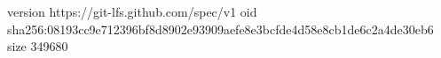 version https://git-lfs.github.com/spec/v1
oid sha256:08193cc9e712396bf8d8902e93909aefe8e3bcfde4d58e8cb1de6c2a4de30eb6
size 349680
